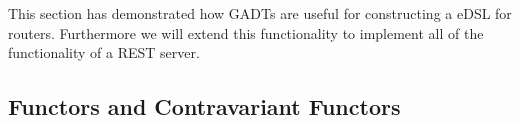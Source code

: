 This section has demonstrated how GADTs are useful for constructing a eDSL for
routers. Furthermore we will extend this functionality to implement all of the
functionality of a REST server.






\subsection{Functors and Contravariant Functors}

